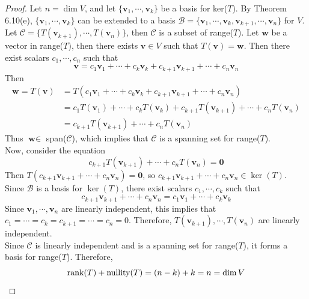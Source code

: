 \begin{proof}
	Let $n = \dim V$, and let $\{ \textbf{v}_1, \cdots, \textbf{v}_k \}$ be a basis for ker($T$). By Theorem 6.10(e), $\{ \textbf{v}_1, \cdots, \textbf{v}_k \}$ can be extended to a basis $\mathcal{B} = \{ \textbf{v}_1, \cdots, \textbf{v}_k, \textbf{v}_{k+1}, \cdots, \textbf{v}_n \}$ for $V$. \\
	
	Let $\mathcal{C} = \{ T(\textbf{v}_{k+1}), \cdots, T(\textbf{v}_n) \}$, then $\mathcal{C}$ is a subset of range($T$). Let $\textbf{w}$ be a vector in range($T$), then there exists $\textbf{v} \in V$ such that $T(\textbf{v}) = \textbf{w}$. Then there exist scalars $c_1, \cdots, c_n$ such that \begin{equation*}
		\textbf{v} = c_1\textbf{v}_1 + \cdots + c_k\textbf{v}_k + c_{k+1}\textbf{v}_{k+1} + \cdots + c_n\textbf{v}_n
	\end{equation*} Then \begin{align*}
		\textbf{w} = T(\textbf{v}) &= T(c_1\textbf{v}_1 + \cdots + c_k\textbf{v}_k + c_{k+1}\textbf{v}_{k+1} + \cdots + c_n\textbf{v}_n) \\
		&= c_1T(\textbf{v}_1) + \cdots + c_kT(\textbf{v}_k) + c_{k+1}T(\textbf{v}_{k+1}) + \cdots + c_nT(\textbf{v}_n) \\
		&= c_{k+1}T(\textbf{v}_{k+1}) + \cdots + c_nT(\textbf{v}_n)
	\end{align*} Thus $\textbf{w} \in $ span($\mathcal{C}$), which implies that $\mathcal{C}$ is a spanning set for range($T$). \\
	
	Now, consider the equation \begin{equation*}
		c_{k+1}T(\textbf{v}_{k+1}) + \cdots + c_nT(\textbf{v}_n) = \textbf{0}
	\end{equation*} Then $T(c_{k+1}\textbf{v}_{k+1} + \cdots + c_n\textbf{v}_n) = \textbf{0}$, so $c_{k+1}\textbf{v}_{k+1} + \cdots + c_n\textbf{v}_n \in \ker(T)$. Since $\mathcal{B}$ is a basis for $\ker(T)$, there exist scalars $c_1, \cdots, c_k$ such that \begin{equation*}
		c_{k+1}\textbf{v}_{k+1} + \cdots + c_n\textbf{v}_n = c_1\textbf{v}_1 + \cdots + c_k\textbf{v}_k
	\end{equation*} Since $\textbf{v}_1, \cdots, \textbf{v}_n$ are linearly independent, this implies that $c_1 = \cdots = c_k = c_{k+1} = \cdots = c_n = 0$. Therefore, $T(\textbf{v}_{k+1}), \cdots, T(\textbf{v}_n)$ are linearly independent. \\
	
	Since $\mathcal{C}$ is linearly independent and is a spanning set for range($T$), it forms a basis for range($T$). Therefore, \begin{equation*}
		\textnormal{rank}(T) + \textnormal{nullity}(T) = (n - k) + k = n = \dim V
	\end{equation*}
\end{proof}

